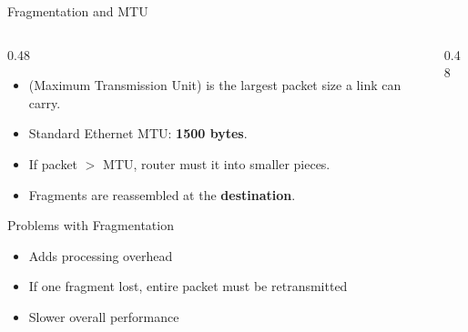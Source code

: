 \documentclass[aspectratio=169]{beamer}  %
\begin{document}
\begin{frame}{Fragmentation and MTU}
    \begin{columns}[T]
        \begin{column}{0.48\textwidth}
            \begin{itemize}
                \item {} (Maximum Transmission Unit) is the largest packet size a link can carry.
                \item Standard Ethernet MTU: \textbf{1500 bytes}.
                \item If packet $>$ MTU, router must  it into smaller pieces.
                \item Fragments are reassembled at the \textbf{destination}.
            \end{itemize}
            
            \vspace{0.3em}
            \begin{alertblock}{Problems with Fragmentation}
                \small
                \begin{itemize}\setlength{\itemsep}{1pt}
                    \item Adds processing overhead
                    \item If one fragment lost, entire packet must be retransmitted
                    \item Slower overall performance
                \end{itemize}
            \end{alertblock}
        \end{column}
        \begin{column}{0.48\textwidth}
            \begin{center}
\end{center}
\end{column}
\end{columns}
\end{frame}
\end{document}
